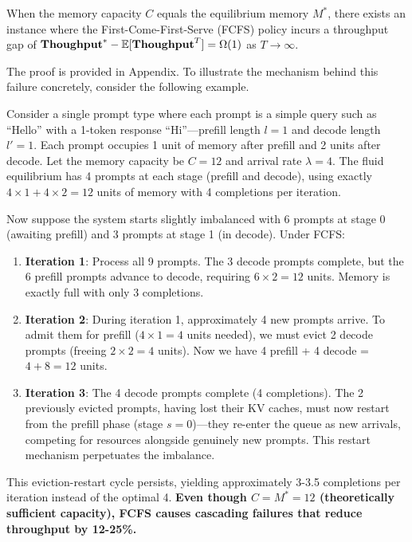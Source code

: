 \begin{proposition}\label{prop:lower_bound_FCFS}
When the memory capacity \(C\) equals the equilibrium memory \(M^*\), there exists an instance where the First-Come-First-Serve (FCFS) policy incurs a throughput gap of \(\textbf{Thoughput}^* - \mathbb{E}[\textbf{Thoughput}^T] = \Omega(1)\) as \(T \to \infty\).
\end{proposition}

The proof is provided in Appendix. To illustrate the mechanism behind this failure concretely, consider the following example.

\begin{example}
\label{ex:fcfs_cascade}
Consider a single prompt type where each prompt is a simple query such as ``Hello'' with a 1-token response ``Hi''---prefill length $l=1$ and decode length $l'=1$. Each prompt occupies 1 unit of memory after prefill and 2 units after decode. Let the memory capacity be $C=12$ and arrival rate $\lambda=4$. The fluid equilibrium has 4 prompts at each stage (prefill and decode), using exactly $4 \times 1 + 4 \times 2 = 12$ units of memory with 4 completions per iteration.

Now suppose the system starts slightly imbalanced with 6 prompts at stage 0 (awaiting prefill) and 3 prompts at stage 1 (in decode). Under FCFS:
\begin{enumerate}
    \item \textbf{Iteration 1}: Process all 9 prompts. The 3 decode prompts complete, but the 6 prefill prompts advance to decode, requiring $6 \times 2 = 12$ units. Memory is exactly full with only 3 completions.
    \item \textbf{Iteration 2}: During iteration 1, approximately 4 new prompts arrive. To admit them for prefill ($4 \times 1 = 4$ units needed), we must evict 2 decode prompts (freeing $2 \times 2 = 4$ units). Now we have 4 prefill + 4 decode = $4 + 8 = 12$ units.
    \item \textbf{Iteration 3}: The 4 decode prompts complete (4 completions). The 2 previously evicted prompts, having lost their KV caches, must now restart from the prefill phase (stage $s=0$)---they re-enter the queue as new arrivals, competing for resources alongside genuinely new prompts. This restart mechanism perpetuates the imbalance.
\end{enumerate}
This eviction-restart cycle persists, yielding approximately 3-3.5 completions per iteration instead of the optimal 4. \textbf{Even though $C = M^* = 12$ (theoretically sufficient capacity), FCFS causes cascading failures that reduce throughput by 12-25\%.}
\end{example}

